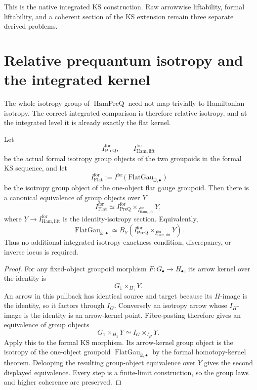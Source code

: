 This is the native integrated KS construction.  Raw arrowwise liftability,
formal liftability, and a coherent section of the KS extension remain three
separate derived problems.

\section{Relative prequantum isotropy and the integrated kernel}
\label{sec:prequantum-isotropy-discrepancy}

The whole isotropy group of $\operatorname{HamPreQ}$ need not map trivially to
Hamiltonian isotropy.  The correct integrated comparison is therefore relative
isotropy, and at the integrated level it is already exactly the flat kernel.

\begin{theorem}
\label{prop:prequantum-universal-isotropy-exact-extension}
Let
\[
I^{\mathrm{for}}_{\mathrm{PreQ}},
\qquad
I^{\mathrm{for}}_{\mathrm{Ham,lift}}
\]
be the actual formal isotropy group objects of the two groupoids in the formal KS
sequence, and let
\[
I^{\mathrm{for}}_{\mathrm{Flat}}
:=
I^{\mathrm{for}}
\bigl(\operatorname{FlatGau}_{\widehat\omega,\bullet}\bigr)
\]
be the isotropy group object of the one-object flat gauge groupoid.  Then there is
a canonical equivalence of group objects over $Y$
\[
\boxed{
I^{\mathrm{for}}_{\mathrm{Flat}}
\simeq
I^{\mathrm{for}}_{\mathrm{PreQ}}
\times_{I^{\mathrm{for}}_{\mathrm{Ham,lift}}}Y,
}
\]
where $Y\to I^{\mathrm{for}}_{\mathrm{Ham,lift}}$ is the identity-isotropy section.
Equivalently,
\[
\operatorname{FlatGau}_{\widehat\omega,\bullet}
\simeq
B_Y\left(
I^{\mathrm{for}}_{\mathrm{PreQ}}
\times_{I^{\mathrm{for}}_{\mathrm{Ham,lift}}}Y
\right).
\]
Thus no additional integrated isotropy-exactness condition, discrepancy, or inverse
locus is required.
\end{theorem}

\begin{proof}
For any fixed-object groupoid morphism $F:G_\bullet\to H_\bullet$, its arrow kernel
over the identity is
\[
G_1\times_{H_1}Y.
\]
An arrow in this pullback has identical source and target because its $H$-image is
the identity, so it factors through $I_G$.  Conversely an isotropy arrow whose
$I_H$-image is the identity is an arrow-kernel point.  Fibre-pasting therefore
gives an equivalence of group objects
\[
G_1\times_{H_1}Y
\simeq
I_G\times_{I_H}Y.
\]
Apply this to the formal KS morphism.  Its arrow-kernel group object is the
isotropy of the one-object groupoid
$\operatorname{FlatGau}_{\widehat\omega,\bullet}$ by the formal homotopy-kernel
theorem.  Delooping the resulting group-object equivalence over $Y$ gives the
second displayed equivalence.  Every step is a finite-limit construction, so the
group laws and higher coherence are preserved.
\end{proof}

